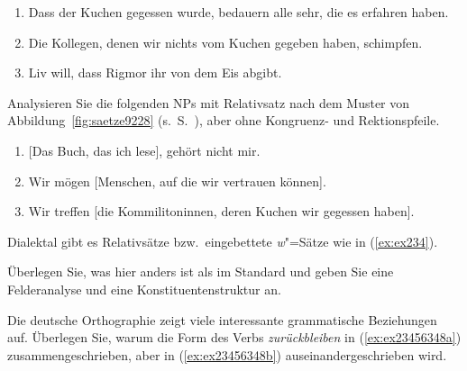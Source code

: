 \begin{enumerate}\Lf
  \item Dass der Kuchen gegessen wurde, bedauern alle sehr, die es erfahren haben.
  \item Die Kollegen, denen wir nichts vom Kuchen gegeben haben, schimpfen.
  \item Liv will, dass Rigmor ihr von dem Eis abgibt.
\end{enumerate}

\Uebung[\tristar] \label{u125} Analysieren Sie die folgenden NPs mit Relativsatz nach dem Muster von Abbildung~\ref{fig:saetze9228} (s.\ S.~\pageref{fig:saetze9228}), aber ohne Kongruenz- und Rektionspfeile.

\begin{enumerate}\Lf
  \item{[Das Buch, das ich lese], gehört nicht mir.}
  \item Wir mögen [Menschen, auf die wir vertrauen können].
  \item Wir treffen [die Kommilitoninnen, deren Kuchen wir gegessen haben].
\end{enumerate}

\Np

\Uebung[\tristar] \label{u126} Dialektal gibt es Relativsätze bzw.\ eingebettete \textit{w}"=Sätze wie in (\ref{ex:ex234}).

\begin{exe}
\end{exe}

Überlegen Sie, was hier anders ist als im Standard und geben Sie eine Felderanalyse und eine Konstituentenstruktur an.

\Uebung[\tristar] \label{u127} Die deutsche Orthographie zeigt viele interessante grammatische Beziehungen auf.
Überlegen Sie, warum die Form des Verbs \textit{zurückbleiben} in (\ref{ex:ex23456348a}) zusammengeschrieben, aber in (\ref{ex:ex23456348b}) auseinandergeschrieben wird.

\begin{exe}
  \ex\label{ex:ex23456348}
  \begin{xlist}
  \end{xlist}
\end{exe}

